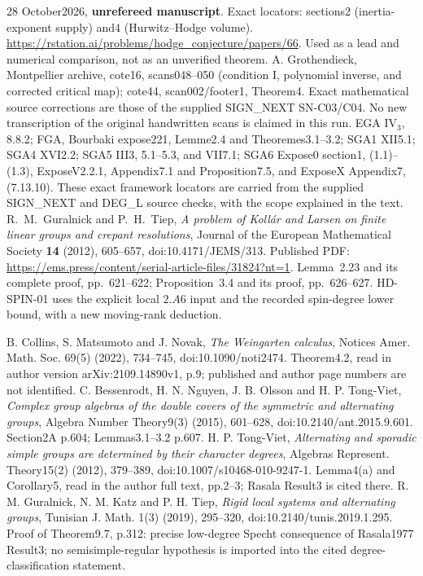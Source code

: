 28 October2026, \textbf{unrefereed manuscript}.
Exact locators: sections2 (inertia-exponent supply) and4
(Hurwitz--Hodge volume). \url{https://rstation.ai/problems/hodge_conjecture/papers/66}.
Used as a lead and numerical comparison, not as an unverified theorem.
A. Grothendieck, Montpellier archive, cote16, scans048--050
(condition I, polynomial inverse, and corrected critical map);
cote44, scan002/footer1, Theorem4. Exact mathematical source corrections
are those of the supplied SIGN\_NEXT SN-C03/C04. No new transcription
of the original handwritten scans is claimed in this run.
EGA IV$_3$, 8.8.2; FGA, Bourbaki expose221, Lemme2.4 and
Theoremes3.1--3.2; SGA1 XII5.1; SGA4 XVI2.2;
SGA5 III3, 5.1--5.3, and VII7.1;
SGA6 Expose0 section1, (1.1)--(1.3), ExposeV2.2.1,
Appendix7.1 and Proposition7.5, and ExposeX Appendix7, (7.13.10).
These exact framework locators are carried from the supplied
SIGN\_NEXT and DEG\_L source checks, with the scope explained in the text.
R.~M.~Guralnick and P.~H.~Tiep,
\emph{A problem of Koll\'ar and Larsen on finite linear groups
and crepant resolutions},
Journal of the European Mathematical Society \textbf{14}
(2012), 605--657, doi:10.4171/JEMS/313.
Published PDF: \url{https://ems.press/content/serial-article-files/31824?nt=1}.
Lemma~2.23 and its complete proof, pp.~621--622;
Proposition~3.4 and its proof, pp.~626--627.
HD-SPIN-01 uses the explicit local $2.A6$ input and the recorded
spin-degree lower bound, with a new moving-rank deduction.

 B. Collins, S. Matsumoto and J. Novak,
\emph{The Weingarten calculus}, Notices Amer. Math. Soc. 69(5)
(2022), 734--745, doi:10.1090/noti2474.
Theorem4.2, read in author version arXiv:2109.14890v1, p.9;
published and author page numbers are not identified.
 C. Bessenrodt, H. N. Nguyen, J. B. Olsson
and H. P. Tong-Viet, \emph{Complex group algebras of the double
covers of the symmetric and alternating groups}, Algebra Number
Theory9(3) (2015), 601--628, doi:10.2140/ant.2015.9.601.
Section2A p.604; Lemmas3.1--3.2 p.607.
 H. P. Tong-Viet, \emph{Alternating and
sporadic simple groups are determined by their character degrees},
Algebras Represent. Theory15(2) (2012), 379--389,
doi:10.1007/s10468-010-9247-1. Lemma4(a) and Corollary5,
read in the author full text, pp.2--3; Rasala Result3 is cited there.
 R. M. Guralnick, N. M. Katz and P. H. Tiep,
\emph{Rigid local systems and alternating groups}, Tunisian J. Math.
1(3) (2019), 295--320, doi:10.2140/tunis.2019.1.295.
Proof of Theorem9.7, p.312: precise low-degree Specht consequence
of Rasala1977 Result3; no semisimple-regular hypothesis is imported
into the cited degree-classification statement.
